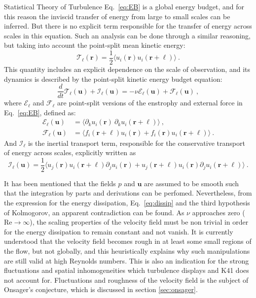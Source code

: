 \begin{chapter}{Statistical Theory of Turbulence}
Eq.~\eqref{eq:EB} is a global energy budget, and for this reason the
inviscid transfer of energy from large to small scales can be inferred.
But there is no explicit term responsible for the transfer of energy
across scales in this equation. Such an analysis can be done through a similar
reasoning, but taking into account the point-split mean kinetic
energy:
\begin{equation}
	\mathcal{T}_{\ell}(\bm{r}) = \frac12 \big\langle u_i(\bm{r}) u_i(\bm{r+\ell}) \big\rangle \ .
\end{equation}
This quantity includes an explicit dependence on the scale of observation,
and its dynamics is described by the point-split kinetic energy
budget equation:
\begin{equation} \label{eq:EB-split}
	\frac{d}{dt} \mathcal{T}_{\ell}(\mathbf{u}) + \mathcal{I}_{\ell}(\bm{u})
	= - \nu \mathcal{E}_{\ell}(\mathbf{u})
	+ \mathcal{F}_{\ell}(\bm{u}) \ ,
\end{equation}
where $\mathcal{E}_{\ell}$ and $\mathcal{F}_{\ell}$ are point-split
versions of the enstrophy and external force in Eq.~\eqref{eq:EB}, defined as:
\begin{align}
	\mathcal{E}_{\ell}(\mathbf{u}) &= \big\langle \partial_k u_i(\bm{r}) \ \partial_k u_i(\bm{r+\ell}) \big\rangle \ ,\\
	\mathcal{F}_{\ell}(\mathbf{u}) &= \big\langle f_i(\bm{r+\ell}) u_i(\mathbf{r}) + f_i(\mathbf{r}) u_i(\bm{r+\ell}) \big\rangle \ .
\end{align}
And $\mathcal{I}_{\ell}$ is the inertial transport term, responsible for the
conservative transport of energy across scales, explicitly written as
\begin{equation} \label{eq:inertial-transport}
	\mathcal{I}_{\ell}(\bm{u}) =
	\frac12 \big\langle u_j(\bm{r}) u_i(\bm{r+\ell}) \partial_j u_i(\bm{r})
	+ u_j(\bm{r+\ell}) u_i(\bm{r}) \partial_j u_i(\bm{r+\ell}) \big\rangle \ .
\end{equation}

It has been mentioned that the fields $p$ and $\mathbf{u}$ are assumed to
be smooth such that the integration by parts and derivations can be perfomed.
Nevertheless, from the expression for the energy
dissipation, Eq.~\ref{eq:dissip} and the third hypothesis of Kolmogorov,
an apparent contradiction can be found.
As $\nu$ approaches zero ($\mathrm{Re} \to \infty$),
the scaling properties of the velocity field must be non trivial
in order for the energy dissipation to remain constant and not vanish.
It is currently understood that the velocity field becomes rough
in at least some small regions of the flow, but not globally, and this
heuristically explains why such manipulations are still valid at high Reynolds numbers.
This is also an indication for the strong fluctuations and spatial
inhomogeneities which turbulence displays and K41 does not
account for.
Fluctuations and roughness of the velocity field is the subject
of Onsager's conjecture, which is discussed in section \ref{sec:onsager}.


\end{chapter}

